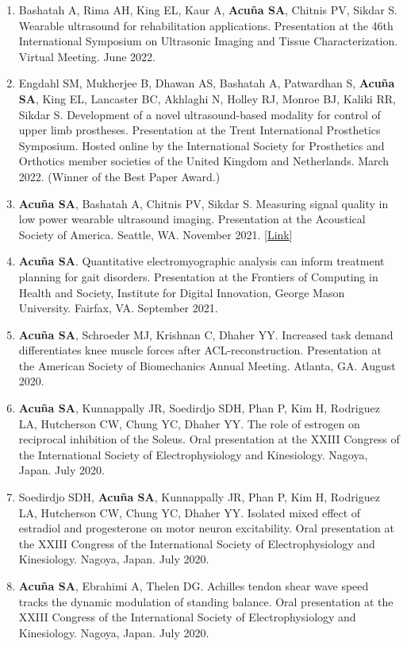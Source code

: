 \documentclass[letterpaper, 10pt]{article}
\begin{document}
\begin{enumerate}
    \item Bashatah A, Rima AH, King EL, Kaur A, \textbf{Acuña SA}, Chitnis PV, Sikdar S. Wearable ultrasound for rehabilitation applications. Presentation at the 46th International Symposium on Ultrasonic Imaging and Tissue Characterization. Virtual Meeting. June 2022.
    \item Engdahl SM, Mukherjee B, Dhawan AS, Bashatah A, Patwardhan S, \textbf{Acuña SA}, King EL, Lancaster BC, Akhlaghi N, Holley RJ, Monroe BJ, Kaliki RR, Sikdar S. Development of a novel ultrasound-based modality for control of upper limb prostheses. Presentation at the Trent International Prosthetics Symposium. Hosted online by the International Society for Prosthetics and Orthotics member societies of the United Kingdom and Netherlands. March 2022. (Winner of the Best Paper Award.)
    \item \textbf{Acuña SA}, Bashatah A, Chitnis PV, Sikdar S. Measuring signal quality in low power wearable ultrasound imaging. Presentation at the Acoustical Society of America. Seattle, WA. November 2021. [\href{https://asa.scitation.org/doi/10.1121/10.0007727}{Link}]
    \item \textbf{Acuña SA}. Quantitative electromyographic analysis can inform treatment planning for gait disorders. Presentation at the Frontiers of Computing in Health and Society, Institute for Digital Innovation, George Mason University. Fairfax, VA. September 2021.
    \item \textbf{Acuña SA}, Schroeder MJ, Krishnan C, Dhaher YY. Increased task demand differentiates knee muscle forces after ACL-reconstruction. Presentation at the American Society of Biomechanics Annual Meeting. Atlanta, GA. August 2020.
    \item \textbf{Acuña SA}, Kunnappally JR, Soedirdjo SDH, Phan P, Kim H, Rodriguez LA, Hutcherson CW, Chung YC, Dhaher YY. The role of estrogen on reciprocal inhibition of the Soleus. Oral presentation at the XXIII Congress of the International Society of Electrophysiology and Kinesiology. Nagoya, Japan. July 2020.
    \item Soedirdjo SDH, \textbf{Acuña SA}, Kunnappally JR, Phan P, Kim H, Rodriguez LA, Hutcherson CW, Chung YC, Dhaher YY. Isolated mixed effect of estradiol and progesterone on motor neuron excitability. Oral presentation at the XXIII Congress of the International Society of Electrophysiology and Kinesiology. Nagoya, Japan. July 2020.
    \item \textbf{Acuña SA}, Ebrahimi A, Thelen DG. Achilles tendon shear wave speed tracks the dynamic modulation of standing balance. Oral presentation at the XXIII Congress of the International Society of Electrophysiology and Kinesiology. Nagoya, Japan. July 2020.

\end{enumerate}
\end{document}
